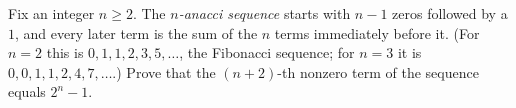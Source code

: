 Fix an integer \(n\ge2\). The \emph{\(n\)-anacci sequence} starts with \(n-1\) zeros followed by a \(1\), and every later term is the sum of the \(n\) terms immediately before it. (For \(n=2\) this is \(0,1,1,2,3,5,\dots\), the Fibonacci sequence; for \(n=3\) it is \(0,0,1,1,2,4,7,\dots\).) Prove that the \((n+2)\)-th nonzero term of the sequence equals \(2^n-1\).
